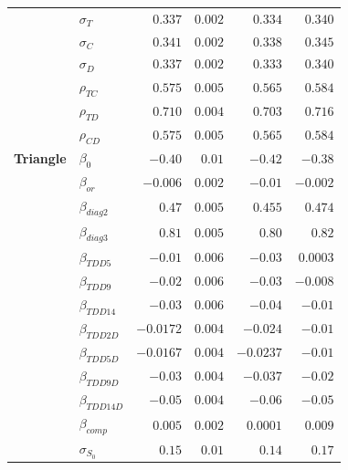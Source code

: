 \begin{table}[ht]
\begin{tabular}{llrrrr}
                    &  $\sigma_{T}$    &    $0.337$   &   $0.002$   &  $0.334$     & $0.340$     \\
                    &  $\sigma_{C}$    &    $0.341$   &   $0.002$   &  $0.338$     & $0.345$     \\
                    &  $\sigma_{D}$    &    $0.337$   &   $0.002$   &  $0.333$     & $0.340$     \\
                    &  $\rho_{TC}$     &    $0.575$   &   $0.005$   &  $0.565$     & $0.584$     \\
                    &  $\rho_{TD}$     &    $0.710$   &   $0.004$   &  $0.703$     & $0.716$     \\
                    &  $\rho_{CD}$     &    $0.575$   &   $0.005$   &  $0.565$     & $0.584$     \\
        \textbf{Triangle}    &  $\beta_{0}$     &    $-0.40$   &   $0.01$    &  $-0.42$     & $-0.38$     \\
                    &  $\beta_{or}$    &    $-0.006$  &   $0.002$   &  $-0.01$     & $-0.002$    \\
                    &  $\beta_{diag2}$ &    $0.47$    &   $0.005$   &  $0.455$     & $0.474$     \\
                    &  $\beta_{diag3}$ &    $0.81$    &   $0.005$   &  $0.80$      & $0.82$      \\
                    &  $\beta_{TDD5}$  &    $-0.01$   &   $0.006$   &  $-0.03$     & $0.0003$    \\
                    &  $\beta_{TDD9}$  &    $-0.02$   &   $0.006$   &  $-0.03$     & $-0.008$    \\
                    &  $\beta_{TDD14}$ &    $-0.03$   &   $0.006$   &  $-0.04$     & $-0.01$     \\
                    &  $\beta_{TDD2D}$ &    $-0.0172$ &   $0.004$   &  $-0.024$    & $-0.01$     \\
                    &  $\beta_{TDD5D}$ &    $-0.0167$ &   $0.004$   &  $-0.0237$   & $-0.01$     \\
                    &  $\beta_{TDD9D}$ &    $-0.03$   &   $0.004$   &  $-0.037$    & $-0.02$     \\
                    &  $\beta_{TDD14D}$&    $-0.05$   &   $0.004$   &  $-0.06$     & $-0.05$     \\
                    &  $\beta_{comp}$  &    $0.005$   &   $0.002$   &  $0.0001$    & $0.009$     \\
                    &  $\sigma_{S_0}$  &    $0.15$    &   $0.01$    &  $0.14$      & $0.17$      \\

\end{tabular}
\end{table}
